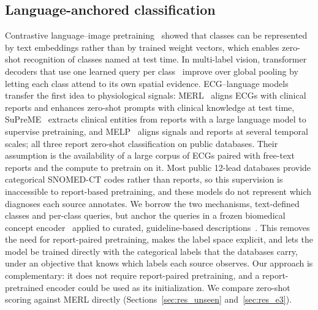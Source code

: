 \subsection{Language-anchored classification}\label{sec:rel_lang}
Contrastive language--image pretraining~\cite{radford2021} showed that classes can be represented by text embeddings rather than by trained weight vectors, which enables zero-shot recognition of classes named at test time. In multi-label vision, transformer decoders that use one learned query per class~\cite{liu2021q2l,ridnik_mldecoder} improve over global pooling by letting each class attend to its own spatial evidence. ECG--language models transfer the first idea to physiological signals: MERL~\cite{merl2024} aligns ECGs with clinical reports and enhances zero-shot prompts with clinical knowledge at test time, SuPreME~\cite{suprime2025} extracts clinical entities from reports with a large language model to supervise pretraining, and MELP~\cite{melp2025} aligns signals and reports at several temporal scales; all three report zero-shot classification on public databases. Their assumption is the availability of a large corpus of ECGs paired with free-text reports and the compute to pretrain on it. Most public 12-lead databases provide categorical SNOMED-CT codes rather than reports, so this supervision is inaccessible to report-based pretraining, and these models do not represent which diagnoses each source annotates. We borrow the two mechanisms, text-defined classes and per-class queries, but anchor the queries in a frozen biomedical concept encoder~\cite{remy_biolord} applied to curated, guideline-based descriptions~\cite{kligfield2007,surawicz2009}. This removes the need for report-paired pretraining, makes the label space explicit, and lets the model be trained directly with the categorical labels that the databases carry, under an objective that knows which labels each source observes. Our approach is complementary: it does not require report-paired pretraining, and a report-pretrained encoder could be used as its initialization. We compare zero-shot scoring against MERL directly (Sections~\ref{sec:res_unseen} and~\ref{sec:res_e3}).

